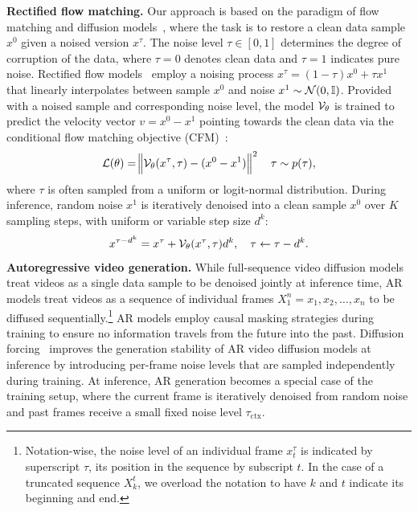 \documentclass{article}
\theoremstyle{plain}
\theoremstyle{definition}
\theoremstyle{remark}
\providecommand{\DIFaddend}{} %
\DeclareRobustCommand{\DIFaddend}{\DIFOaddend \let\includegraphics\DIFOincludegraphics} %
\begin{document}
\DIFaddend \textbf{Rectified flow matching.} Our approach is based on the paradigm of flow matching and diffusion models~\citep{lipman2022flow}, where the task is to restore a clean data sample $x^0$ given a noised version $x^\tau$.
The noise level $\tau \in [0, 1]$ determines the degree of corruption of the data, where $\tau=0$ denotes clean data and $\tau=1$ indicates pure noise.
Rectified flow models~\citep{lipman2022flow,albergo2023building} employ a noising process $x^\tau = (1-\tau)x^0 + \tau x^1$ that linearly interpolates between sample $x^0$ and noise $x^1 \sim \mathcal{N}(0,{\mathbb{I}})$. 
Provided with a noised sample and corresponding noise level, the model ${\mathcal{V}}_\theta$ is trained to predict the velocity vector $v = x^0 - x^1$ pointing towards the clean data via the conditional flow matching objective (CFM)~\citep{lipman2022flow}: 
\begin{equation}
    \mathcal{L}(\theta) = \norm{{\mathcal{V}}_\theta (x^\tau, \tau) - (x^0 - x^1)}^2 \quad \tau \sim p(\tau),
\end{equation}
where $\tau$ is often sampled from a uniform or logit-normal distribution.
During inference, random noise $x^1$ is iteratively denoised into a clean sample $x^0$ over $K$ sampling steps, with uniform or variable step size $d^k$:
%
\begin{equation}
    x^{\tau - d^k} = x^\tau + {\mathcal{V}}_\theta (x^\tau, \tau) d^k, \quad \tau \leftarrow \tau - d^k.
\end{equation}
\textbf{Autoregressive video generation.} While full-sequence video diffusion models treat videos as a single data sample to be denoised jointly at inference time, AR models treat videos as a sequence of individual frames $X^{n}_1 = x_1,x_2,\dots,x_n$ to be diffused sequentially.\footnote{Notation-wise, the noise level of an individual frame $x^\tau_t$ is indicated by superscript $\tau$, its position in the sequence by subscript $t$.
In the case of a truncated sequence $X_k^{t}$, we overload the notation to have $k$ and $t$ indicate its beginning and end.} AR models employ causal masking strategies during training to ensure no information travels from the future into the past. Diffusion forcing~\citep{chen2024diffusion}
improves the generation stability of AR video diffusion models at inference by introducing per-frame noise levels that are sampled independently during training.
At inference, AR generation becomes a special case of the training setup, where the current frame is iteratively denoised from random noise and past frames receive a small fixed noise level $\tau_\text{ctx}$.
\end{document}
